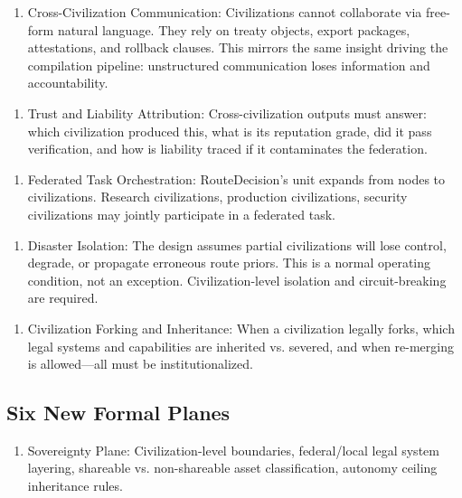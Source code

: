 \documentclass[12pt,a4paper]{article}
\begin{document}
\begin{enumerate}
  \item Cross-Civilization Communication: Civilizations cannot collaborate via free-form natural language. They rely on treaty objects, export packages, attestations, and rollback clauses. This mirrors the same insight driving the compilation pipeline: unstructured communication loses information and accountability.
\end{enumerate}

\begin{enumerate}
  \item Trust and Liability Attribution: Cross-civilization outputs must answer: which civilization produced this, what is its reputation grade, did it pass verification, and how is liability traced if it contaminates the federation.
\end{enumerate}

\begin{enumerate}
  \item Federated Task Orchestration: RouteDecision's unit expands from nodes to civilizations. Research civilizations, production civilizations, security civilizations may jointly participate in a federated task.
\end{enumerate}

\begin{enumerate}
  \item Disaster Isolation: The design assumes partial civilizations will lose control, degrade, or propagate erroneous route priors. This is a normal operating condition, not an exception. Civilization-level isolation and circuit-breaking are required.
\end{enumerate}

\begin{enumerate}
  \item Civilization Forking and Inheritance: When a civilization legally forks, which legal systems and capabilities are inherited vs. severed, and when re-merging is allowed---all must be institutionalized.
\end{enumerate}

\subsection{Six New Formal Planes}


\begin{enumerate}
  \item Sovereignty Plane: Civilization-level boundaries, federal/local legal system layering, shareable vs. non-shareable asset classification, autonomy ceiling inheritance rules.
\end{enumerate}
\end{document}
